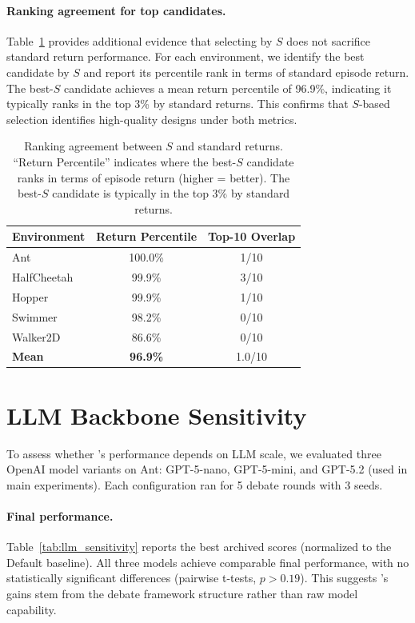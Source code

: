 \paragraph{Ranking agreement for top candidates.}
Table~\ref{tab:ranking_agreement} provides additional evidence that selecting by $S$ does not sacrifice standard return performance. For each environment, we identify the best candidate by $S$ and report its percentile rank in terms of standard episode return. The best-$S$ candidate achieves a mean return percentile of 96.9\%, indicating it typically ranks in the top 3\% by standard returns. This confirms that $S$-based selection identifies high-quality designs under both metrics.

\begin{table}[htbp]
\centering
\caption{Ranking agreement between $S$ and standard returns. ``Return Percentile'' indicates where the best-$S$ candidate ranks in terms of episode return (higher = better). The best-$S$ candidate is typically in the top 3\% by standard returns.}
\label{tab:ranking_agreement}
\small
\begin{tabular}{lcc}
\toprule
\textbf{Environment} & \textbf{Return Percentile} & \textbf{Top-10 Overlap} \\
\midrule
Ant & 100.0\% & 1/10 \\
HalfCheetah & 99.9\% & 3/10 \\
Hopper & 99.9\% & 1/10 \\
Swimmer & 98.2\% & 0/10 \\
Walker2D & 86.6\% & 0/10 \\
\midrule
\textbf{Mean} & \textbf{96.9\%} & 1.0/10 \\
\bottomrule
\end{tabular}
\end{table}

\section{LLM Backbone Sensitivity}
\label{app:llm-sensitivity}

To assess whether \abbrev{}'s performance depends on LLM scale, we evaluated three OpenAI model variants on Ant: GPT-5-nano, GPT-5-mini, and GPT-5.2 (used in main experiments). Each configuration ran for 5 debate rounds with 3 seeds.

\paragraph{Final performance.}
Table~\ref{tab:llm_sensitivity} reports the best archived scores (normalized to the Default baseline). All three models achieve comparable final performance, with no statistically significant differences (pairwise t-tests, $p > 0.19$). This suggests \abbrev{}'s gains stem from the debate framework structure rather than raw model capability.

